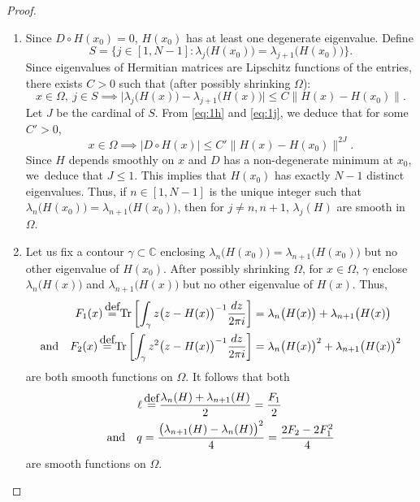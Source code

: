 \documentclass[11pt]{article}
\numberwithin{equation}{section}
\let\sep:
\theoremstyle{definition}
\DeclareMathOperator{\Tr}{Tr}
\newcommand{\C}{\mathbb{C}}
\newcommand{\de}{\,\mathrel{\stackrel{\makebox[0pt]{\mbox{\normalfont\tiny def}}}{=}}}
\begin{document}
\begin{proof}
\begin{enumerate}
\item
Since $D \circ H(x_0) = 0$, $H(x_0)$ has at least one degenerate eigenvalue. Define\vspace*{-3pt}
\begin{equation*}
S = \bigl\{ j \in [1,N-1]\sep \lambda_j\bigl( H(x_0) \bigr) = \lambda_{j+1}\bigl( H(x_0) \bigr) \bigr\}.
\end{equation*}
Since eigenvalues of Hermitian matrices are Lipschitz functions of the entries, there exists $C > 0$ such that (after possibly shrinking $\Omega$):
\begin{equation}\label{eq:1j}
x\in \Omega, \ j \in S \implies
\big|\lambda_j \bigl( H(x) \bigr) - \lambda_{j+1} \bigl( H(x) \bigr)\big| \leq C \big\| H(x)-H(x_0)\big\|.
\end{equation}
Let $J$ be the cardinal of $S$. From \eqref{eq:1h} and \eqref{eq:1j}, we deduce that for some $C' > 0$,\vspace*{-3pt}
\begin{equation*}
x\in \Omega \implies \big| D \circ H(x) \big| \leq C' \big\| H(x)-H(x_0)\big\|^{2J}.
\end{equation*}
Since $H$ depends smoothly on $x$ and $D$ has a non-degenerate minimum at $x_0$, we~deduce that $J \leq 1$. This implies that $H(x_0)$ has exactly $N-1$ distinct eigenvalues. Thus, if $n \in [1,N-1]$ is the unique integer such that $\lambda_n\bigl( H(x_0) \bigr) = \lambda_{n+1}\bigl( H(x_0)\bigr)$, then for $j \neq n, n+1$, $\lambda_j(H)$ are smooth in $\Omega$.

\item
Let us fix a contour $\gamma \subset \C$ enclosing $\lambda_n\bigl(H(x_0)\bigr) = \lambda_{n+1}\bigl(H(x_0)\bigr)$ but no other eigenvalue of $H(x_0)$. After possibly shrinking $\Omega$, for $x \in \Omega$, $\gamma$ enclose $\lambda_n\bigl(H(x)\bigr)$ and $\lambda_{n+1}\bigl(H(x)\bigr)$ but no other eigenvalue of $H(x)$. Thus,\vspace*{-3pt}
\begin{equation}\label{eq:0a}
\begin{split}
F_1(x) \de \Tr \left[ \int_\gamma z \bigl(z-H(x)\bigr)^{-1} \dfrac{dz}{2\pi i} \right] &= \lambda_n\bigl(H(x)\bigr) + \lambda_{n+1}\bigl(H(x)\bigr)
\\
\text{and} \quad F_2(x) \de \Tr \left[ \int_\gamma z^2 \bigl(z-H(x)\bigr)^{-1} \dfrac{dz}{2\pi i} \right] &= \lambda_n\bigl(H(x)\bigr)^2 + \lambda_{n+1}\bigl(H(x)\bigr)^2
\end{split}
\end{equation}
are both smooth functions on $\Omega$. It follows that both
\begin{equation}\label{eq:1m}
\begin{split}
\ell &\de \dfrac{\lambda_n(H) + \lambda_{n+1}(H)}{2} = \dfrac{F_1}{2} \\
\text{and} \quad q &= \dfrac{\bigl(\lambda_{n+1}(H) - \lambda_n(H)\bigr)^2}{4} = \dfrac{2F_2-2F_1^2}{4}
\end{split}
\end{equation}
are smooth functions on $\Omega$.


\end{enumerate}
\end{proof}
\end{document}
